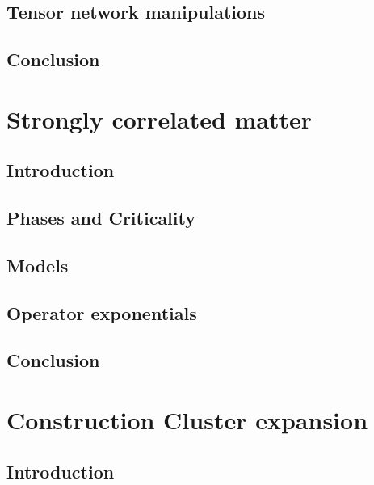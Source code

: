 \documentclass{book}
\newcounter{a}
\newcounter{b}
\begin{document}
\section{Tensor network manipulations}\label{sec:mpomath}




\section{Conclusion}


\chapter{Strongly correlated matter}\label{chap3}

\section{Introduction}


\section{Phases and Criticality} \label{sec:PhasesAndCrit}


\section{Models}


\section{Operator exponentials}


\section{Conclusion}


\chapter{Construction Cluster expansion} \label{chap4}

\section{Introduction}

\end{document}
